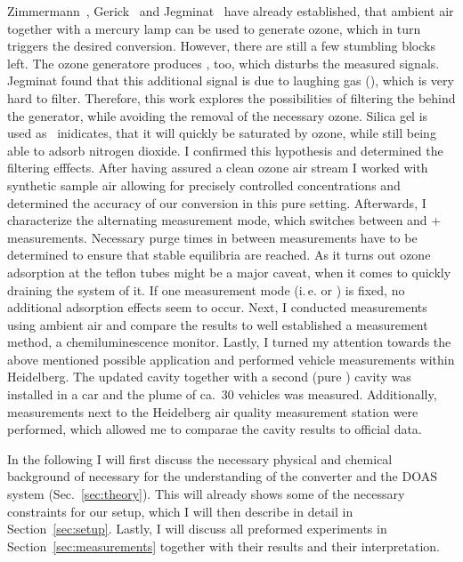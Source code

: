 Zimmermann~\cite{zimmermann}, Gerick~\cite{gerick} and
Jegminat~\cite{bsc} have already established, that ambient air
together with a mercury lamp can be used to generate ozone, which in
turn triggers the desired conversion. However, there are still a few
stumbling blocks left. The ozone generatore produces , too,
which disturbs the measured  signals. Jegminat found that
this additional signal is due to laughing gas (), which is
very hard to filter. Therefore, this work explores the possibilities
of filtering the  behind the generator, while avoiding the
removal of the necessary ozone. Silica gel is used
as~\cite{ozone-silica} inidicates, that it will quickly be saturated
by ozone, while still being able to adsorb nitrogen dioxide. I confirmed
this hypothesis and determined the filtering efffects. After having
assured a clean ozone air stream I worked with synthetic sample air
allowing for precisely controlled  concentrations and determined
the accuracy of our conversion in this pure 
setting. Afterwards, I characterize the alternating measurement mode,
which switches between  and + measurements.
Necessary purge times in between measurements have to be determined to
ensure that stable equilibria are reached. As it turns out ozone
adsorption at the teflon tubes might be a major caveat, when it comes
to quickly draining the system of it. If one measurement mode
(i.\,e.  or ) is fixed, no additional adsorption
effects seem to occur. Next, I conducted measurements using ambient air
and compare the results to well established a  measurement
method, a chemiluminescence monitor. Lastly, I turned my attention
towards the above mentioned possible application and performed vehicle
measurements within Heidelberg. The updated cavity together with a
second (pure ) cavity was installed in a car and the plume of
ca.~30 vehicles was measured. Additionally, measurements next to the
Heidelberg air quality measurement station were performed, which allowed
me to comparae the cavity results to official data.

In the following I will first discuss the necessary physical and
chemical background of necessary for the understanding of the
converter and the DOAS system (Sec.~\ref{sec:theory}). This will
already shows some of the necessary constraints for our setup, which I
will then describe in detail in Section~\ref{sec:setup}. Lastly, I
will discuss all preformed experiments in
Section~\ref{sec:measurements} together with their results and their
interpretation.

